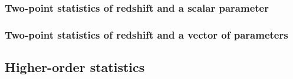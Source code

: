 \documentclass[12pt, onecolumn]{emulateapj}
\begin{document}
\subsubsection{Two-point statistics of redshift and a scalar parameter}
\subsubsection{Two-point statistics of redshift and a vector of parameters}
\subsection{Higher-order statistics}




\end{document}
